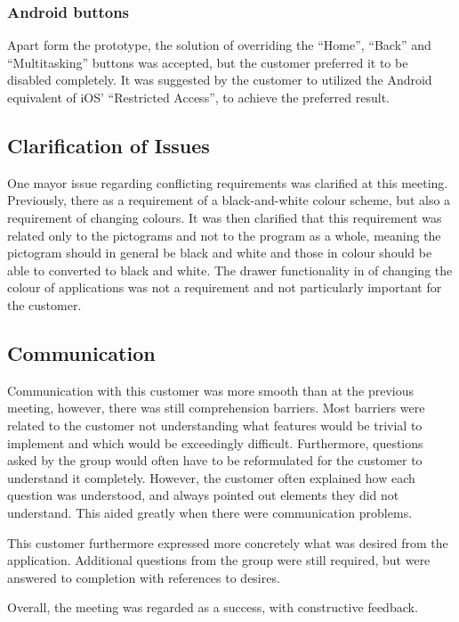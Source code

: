 \subsubsection*{Android buttons}
Apart form the prototype, the solution of overriding the ``Home'', ``Back'' and ``Multitasking'' buttons was accepted, but the customer preferred it to be disabled completely.
It was suggested by the customer to utilized the Android equivalent of iOS' ``Restricted Access'', to achieve the preferred result.

\subsection{Clarification of Issues}
One mayor issue regarding conflicting requirements was clarified at this meeting.
Previously, there as a requirement of a black-and-white colour scheme, but also a requirement of changing colours.
It was then clarified that this requirement was related only to the pictograms and not to the program as a whole, meaning the pictogram should in general be black and white and those in colour should be able to converted to black and white.
The drawer functionality in \launcher of changing the colour of applications was not a requirement and not particularly important for the customer.

\subsection{Communication}
Communication with this customer was more smooth than at the previous meeting, however, there was still comprehension barriers.
Most barriers were related to the customer not understanding what features would be trivial to implement and which would be exceedingly difficult.
Furthermore, questions asked by the group would often have to be reformulated for the customer to understand it completely.
However, the customer often explained how each question was understood, and always pointed out elements they did not understand.
This aided greatly when there were communication problems.

This customer furthermore expressed more concretely what was desired from the application.
Additional questions from the group were still required, but were answered to completion with references to desires.

Overall, the meeting was regarded as a success, with constructive feedback.
